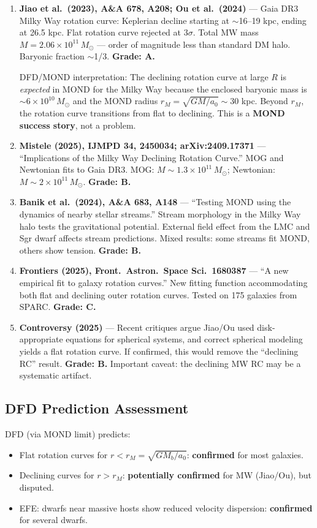 \documentclass[11pt,a4paper]{article}
\begin{document}
\begin{enumerate}

\item \textbf{Jiao et al.\ (2023), A\&A 678, A208; Ou et al.\ (2024)} --- Gaia DR3 Milky Way rotation curve: Keplerian decline starting at $\sim$16--19 kpc, ending at 26.5 kpc. Flat rotation curve rejected at 3$\sigma$. Total MW mass $M = 2.06\times10^{11}\,M_\odot$ --- order of magnitude less than standard DM halo. Baryonic fraction $\sim$1/3. \textbf{Grade: A.}

DFD/MOND interpretation: The declining rotation curve at large $R$ is \emph{expected} in MOND for the Milky Way because the enclosed baryonic mass is $\sim 6\times10^{10}\,M_\odot$ and the MOND radius $r_M = \sqrt{GM/a_0} \sim 30$ kpc. Beyond $r_M$, the rotation curve transitions from flat to declining. This is a \textbf{MOND success story}, not a problem.

\item \textbf{Mistele (2025), IJMPD 34, 2450034; arXiv:2409.17371} --- ``Implications of the Milky Way Declining Rotation Curve.'' MOG and Newtonian fits to Gaia DR3. MOG: $M \sim 1.3\times10^{11}\,M_\odot$; Newtonian: $M \sim 2\times10^{11}\,M_\odot$. \textbf{Grade: B.}

\item \textbf{Banik et al.\ (2024), A\&A 683, A148} --- ``Testing MOND using the dynamics of nearby stellar streams.'' Stream morphology in the Milky Way halo tests the gravitational potential. External field effect from the LMC and Sgr dwarf affects stream predictions. Mixed results: some streams fit MOND, others show tension. \textbf{Grade: B.}

\item \textbf{Frontiers (2025), Front.\ Astron.\ Space Sci.\ 1680387} --- ``A new empirical fit to galaxy rotation curves.'' New fitting function accommodating both flat and declining outer rotation curves. Tested on 175 galaxies from SPARC. \textbf{Grade: C.}

\item \textbf{Controversy (2025)} --- Recent critiques argue Jiao/Ou used disk-appropriate equations for spherical systems, and correct spherical modeling yields a flat rotation curve. If confirmed, this would remove the ``declining RC'' result. \textbf{Grade: B.} Important caveat: the declining MW RC may be a systematic artifact.

\end{enumerate}

\subsection{DFD Prediction Assessment}
DFD (via MOND limit) predicts:
\begin{itemize}
\item Flat rotation curves for $r < r_M = \sqrt{GM_b/a_0}$: \textbf{confirmed} for most galaxies.
\item Declining curves for $r > r_M$: \textbf{potentially confirmed} for MW (Jiao/Ou), but disputed.
\item EFE: dwarfs near massive hosts show reduced velocity dispersion: \textbf{confirmed} for several dwarfs.
\end{itemize}
\end{document}

